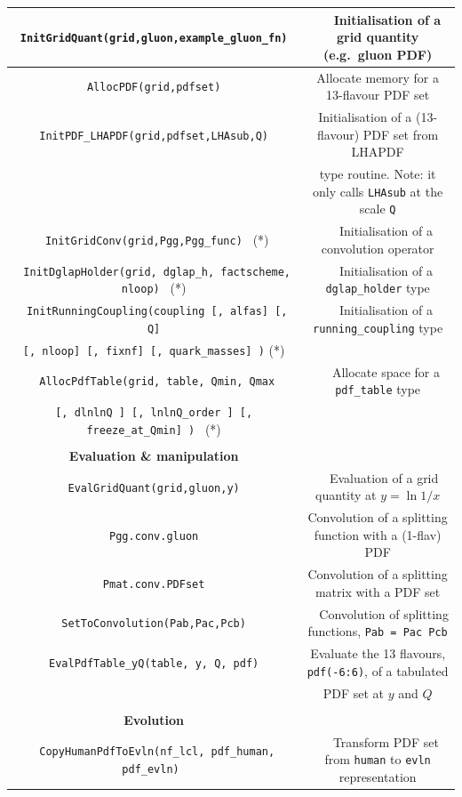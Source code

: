 \documentclass[12pt]{article}
\newcommand{\eg}{e.g.\ }
\newcommand{\ttt}[1]{\texttt{#1}}
\begin{document}
\begin{table}
\begin{center}
\begin{tabular}{|c|c|}
\hline
\texttt{
 InitGridQuant(grid,gluon,example\_gluon\_fn)
} 
 &
~ ~Initialisation of a grid quantity (\eg gluon PDF) \\
\hline
\texttt{
 AllocPDF(grid,pdfset)
} 
 &
Allocate memory for a 13-flavour PDF set \\
\hline
\texttt{InitPDF\_LHAPDF(grid,pdfset,LHAsub,Q)} 
 &
   Initialisation of a (13-flavour) PDF set from LHAPDF \\
&  type routine. Note: it only calls \ttt{LHAsub} at the scale \ttt{Q}\\
\hline
\texttt{
InitGridConv(grid,Pgg,Pgg\_func)
}  (*)
 &
~ ~Initialisation of a convolution operator \\
\hline
\texttt{
InitDglapHolder(grid, dglap\_h, factscheme, nloop)
}  (*)
&
~ ~Initialisation of a {\tt dglap\_holder} type \\
\hline
\texttt{
 InitRunningCoupling(coupling [, alfas] [, Q]} 
&
~ ~Initialisation of a {\tt running\_coupling} type \\
\texttt{[, nloop] [, fixnf] [, quark\_masses] )}  (*)&
\\
\hline
\texttt{
 AllocPdfTable(grid, table, Qmin, Qmax}  
&
~ ~Allocate space for a {\tt pdf\_table} type \\
\texttt{[, dlnlnQ ] [, lnlnQ\_order ] [, freeze\_at\_Qmin] )
} (*) & \\
\hline &\\[-0.5em]
\bf Evaluation \& manipulation & \\[0.3em]
\hline
\texttt{
EvalGridQuant(grid,gluon,y)
}
 & ~~Evaluation of a grid quantity at $y=\ln 1/x$\\
\hline
\texttt{Pgg.conv.gluon} & Convolution of a splitting function with a
(1-flav) PDF  \\
\hline
\texttt{Pmat.conv.PDFset} & Convolution of a splitting matrix
with a PDF set  \\
\hline
\texttt{
SetToConvolution(Pab,Pac,Pcb) 
}
 & ~~Convolution of splitting functions, \ttt{Pab = Pac Pcb} \\
\hline
\texttt{
 EvalPdfTable\_yQ(table, y, Q, pdf)
}
 & Evaluate the 13 flavours, \ttt{pdf(-6:6)}, of a tabulated \\
 & PDF set at $y$ and $Q$\\
\hline&\\[-0.5em]
\bf Evolution  & \\[0.3em]
\hline 
\texttt{
 CopyHumanPdfToEvln(nf\_lcl, pdf\_human, pdf\_evln)
} & ~~
Transform PDF set from {\tt human} to {\tt evln}
representation \\

\end{tabular}
\end{center}
\end{table}
\end{document}
